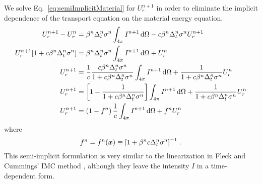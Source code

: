 We solve Eq.~\eqref{eq:semiImplicitMaterial} for $U_r^{n+1}$ in order to
eliminate the implicit dependence of the transport equation on the material
energy equation.
\begin{align} \nonumber
  U_r^{n+1} - U_r^n
  &= \beta^n \Delta_t^n \sigma^n\int_{4\pi} I^{n+1}\mathop{}\!\mathrm{d} \Omega
   - c \beta^n \Delta_t^n \sigma^n U_r^{n+1}
   \\ \nonumber
  U_r^{n+1} [ 1 + c \beta^n \Delta_t^n \sigma^n ]
  &= \beta^n \Delta_t^n \sigma^n\int_{4\pi} I^{n+1}\mathop{}\!\mathrm{d} \Omega + U_r^n
   \\ \nonumber
  U_r^{n+1}
  &= \frac1c \frac{ c \beta^n \Delta_t^n \sigma^n }{ 1 + c \beta^n \Delta_t^n \sigma^n}
  \int_{4\pi} I^{n+1}\mathop{}\!\mathrm{d} \Omega + \frac1{ 1 + c \beta^n \Delta_t^n \sigma^n}
  U_r^n
  \\ \nonumber
  U_r^{n+1}
  &= \left[1 - \frac{1 }{ 1 + c \beta^n \Delta_t^n \sigma^n} \right]
  \int_{4\pi} I^{n+1}\mathop{}\!\mathrm{d} \Omega + \frac1{ 1 + c \beta^n \Delta_t^n \sigma^n}
  U_r^n
  \\ \label{eq:urNPlusOne}
  U_r^{n+1}
  &= \left(1 - f^n\right) \frac1c \int_{4\pi} I^{n+1}\mathop{}\!\mathrm{d} \Omega + f^n U_r^n
\end{align}
where
\begin{equation} \label{eq:fleckFactor}
  f^n = f^n(\bm{x}) \equiv \left[ 1 + \beta^n c \Delta_t^n \sigma^n
  \right]^{-1} \,.
\end{equation}
This semi-implicit formulation is very similar to the linearization in Fleck
and Cummings' IMC method \cite{Fle1971}, although they leave the intensity $I$
in a time-dependent form.

